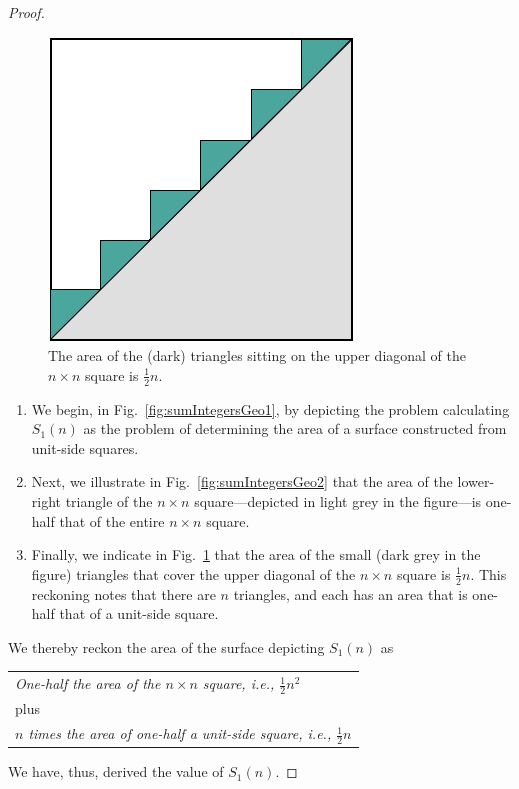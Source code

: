 \begin{proof}
\begin{figure}[ht]
\begin{center}
       \includegraphics[scale=0.4]{FiguresMaths/SumIntegersGeometricFinal}
\caption{The area of the (dark) triangles sitting on the upper
  diagonal of the $n \times n$ square is $\frac{1}{2} n$.}
       \label{fig:sumIntegersGeo3}
\end{center}
\end{figure}
\begin{enumerate}
\item
We begin, in Fig.~\ref{fig:sumIntegersGeo1}, by depicting the problem
calculating $S_1(n)$ as the problem of determining the area of a
surface constructed from unit-side squares.

\item
Next, we illustrate in Fig.~\ref{fig:sumIntegersGeo2} that the area of
the lower-right triangle of the $n \times n$ square---depicted in
light grey in the figure---is one-half that of the entire $n \times n$
square.

\item
Finally, we indicate in Fig.~\ref{fig:sumIntegersGeo3} that the area
of the small (dark grey in the figure) triangles that cover the upper
diagonal of the $n \times n$ square is $\frac{1}{2} n$.  This
reckoning notes that there are $n$ triangles, and each has an area
that is one-half that of a unit-side square.
\end{enumerate}
We thereby reckon the area of the surface depicting $S_1(n)$ as

\begin{tabular}{l}
{\it One-half the area of the $n \times n$ square,
i.e., $\frac{1}{2} n^2$} \\
\hspace*{.15in} plus   \\
{\it $n$ times the area of one-half a unit-side square,
i.e., $\frac{1}{2} n$}
\end{tabular}

\noindent
We have, thus, derived the value of $S_1(n)$.
\end{proof}

